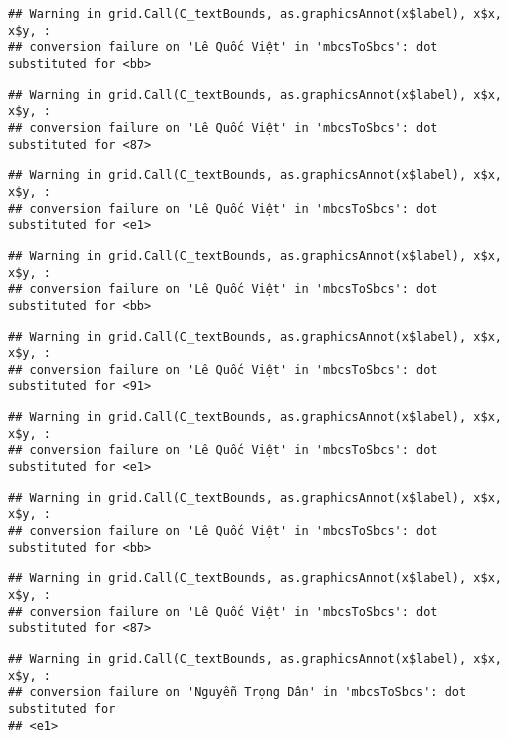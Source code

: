 \documentclass[
]{article}
\begin{document}
\begin{verbatim}
## Warning in grid.Call(C_textBounds, as.graphicsAnnot(x$label), x$x, x$y, :
## conversion failure on 'Lê Quốc Việt' in 'mbcsToSbcs': dot substituted for <bb>
\end{verbatim}

\begin{verbatim}
## Warning in grid.Call(C_textBounds, as.graphicsAnnot(x$label), x$x, x$y, :
## conversion failure on 'Lê Quốc Việt' in 'mbcsToSbcs': dot substituted for <87>
\end{verbatim}

\begin{verbatim}
## Warning in grid.Call(C_textBounds, as.graphicsAnnot(x$label), x$x, x$y, :
## conversion failure on 'Lê Quốc Việt' in 'mbcsToSbcs': dot substituted for <e1>
\end{verbatim}

\begin{verbatim}
## Warning in grid.Call(C_textBounds, as.graphicsAnnot(x$label), x$x, x$y, :
## conversion failure on 'Lê Quốc Việt' in 'mbcsToSbcs': dot substituted for <bb>
\end{verbatim}

\begin{verbatim}
## Warning in grid.Call(C_textBounds, as.graphicsAnnot(x$label), x$x, x$y, :
## conversion failure on 'Lê Quốc Việt' in 'mbcsToSbcs': dot substituted for <91>
\end{verbatim}

\begin{verbatim}
## Warning in grid.Call(C_textBounds, as.graphicsAnnot(x$label), x$x, x$y, :
## conversion failure on 'Lê Quốc Việt' in 'mbcsToSbcs': dot substituted for <e1>
\end{verbatim}

\begin{verbatim}
## Warning in grid.Call(C_textBounds, as.graphicsAnnot(x$label), x$x, x$y, :
## conversion failure on 'Lê Quốc Việt' in 'mbcsToSbcs': dot substituted for <bb>
\end{verbatim}

\begin{verbatim}
## Warning in grid.Call(C_textBounds, as.graphicsAnnot(x$label), x$x, x$y, :
## conversion failure on 'Lê Quốc Việt' in 'mbcsToSbcs': dot substituted for <87>
\end{verbatim}

\begin{verbatim}
## Warning in grid.Call(C_textBounds, as.graphicsAnnot(x$label), x$x, x$y, :
## conversion failure on 'Nguyễn Trọng Dân' in 'mbcsToSbcs': dot substituted for
## <e1>
\end{verbatim}
\end{document}
